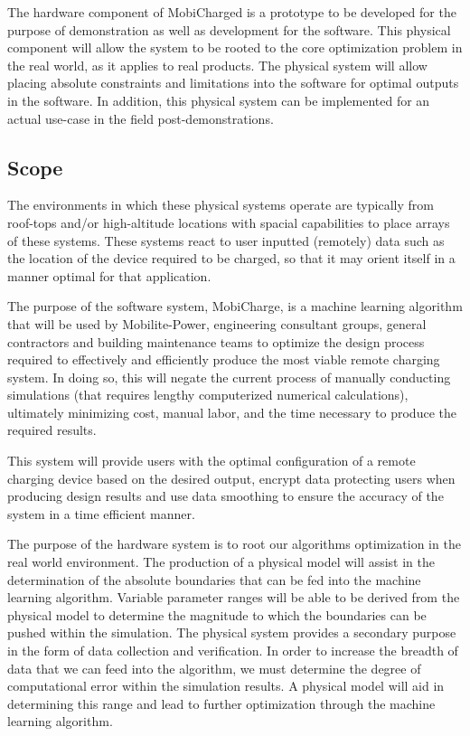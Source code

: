 \documentclass[12pt, titlepage]{article}
\begin{document}
\par
The hardware component of MobiCharged is a prototype to be developed for the purpose of demonstration as well as development for the software. This physical component will allow the system to be rooted to the core optimization problem in the real world, as it applies to real products. The physical system will allow placing absolute constraints and limitations into the software for optimal outputs in the software. In addition, this physical system can be implemented for an actual use-case in the field post-demonstrations. 

\subsection{Scope}
The environments in which these physical systems operate are typically from roof-tops and/or high-altitude locations with spacial capabilities to place arrays of these systems. These systems react to user inputted (remotely) data such as the location of the device required to be charged, so that it may orient itself in a manner optimal for that application. 
\par
The purpose of the software system, MobiCharge, is a machine learning algorithm that will be used by Mobilite-Power, engineering consultant groups, general contractors and building maintenance teams to optimize the design process required to effectively and efficiently produce the most viable remote charging system. In doing so, this will negate the current process of manually conducting simulations (that requires lengthy computerized numerical calculations), ultimately minimizing cost, manual labor, and the time necessary to produce the required results. 
\par
This system will provide users with the optimal configuration of a remote charging device based on the desired output, encrypt data protecting users when producing design results and use data smoothing to ensure the accuracy of the system in a time efficient manner.
\par
The purpose of the hardware system is to root our algorithms optimization in the real world environment. The production of a physical model will assist in the determination of the absolute boundaries that can be fed into the machine learning algorithm. Variable parameter ranges will be able to be derived from the physical model to determine the magnitude to which the boundaries can be pushed within the simulation. 
The physical system provides a secondary purpose in the form of data collection and verification. In order to increase the breadth of data that we can feed into the algorithm, we must determine the degree of computational error within the simulation results. A physical model will aid in determining this range and lead to further optimization through the machine learning algorithm. 
\end{document}
